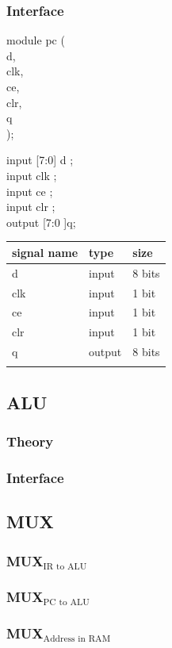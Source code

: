\documentclass[11pt]{article}
\begin{document}
\subsubsection{Interface}
\label{sec:org5380740}
module pc (\\
d,\\
clk,\\
ce,\\
clr,\\
q\\
);

input [7:0] d     ; \\
input clk         ;   \\
input ce      ; \\
input clr     ; \\
output [7:0 ]q; \\

\begin{center}
\begin{tabular}{lll}
signal name & type & size\\
\hline
d & input & 8 bits\\
clk & input & 1 bit\\
ce & input & 1 bit\\
clr & input & 1 bit\\
q & output & 8 bits\\
 &  & \\
\hline
\end{tabular}
\end{center}
\subsection{ALU}
\label{sec:orgd055cb4}
\subsubsection{Theory}
\label{sec:org73722d3}
\subsubsection{Interface}
\label{sec:org1a86bf6}
\subsection{MUX}
\label{sec:orgd307ce5}
\subsubsection{MUX\(_{\text{IR to ALU}}\)}
\label{sec:org6d9e60c}
\subsubsection{MUX\(_{\text{PC to ALU}}\)}
\label{sec:orgc85ba89}
\subsubsection{MUX\(_{\text{Address in RAM}}\)}
\label{sec:org43d153d}
\end{document}
